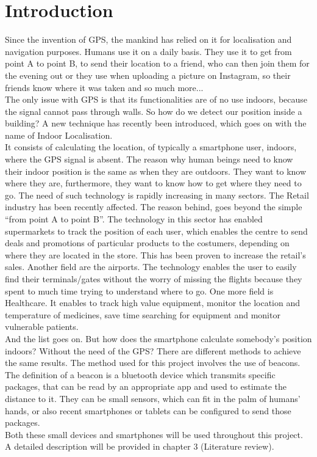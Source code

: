\chapter{Introduction}
Since the invention of GPS, the mankind has relied on it for localisation and navigation purposes. Humans use it on a daily basis. They use it to get from point A to point B, to send their location to a friend, who can then join them for the evening out or they use when uploading a picture on Instagram, so their friends know where it was taken and so much more...\\
The only issue with GPS is that its functionalities are of no use indoors, because the signal cannot pass through walls. So how do we detect our position inside a building? A new technique has recently been introduced, which goes on with the name of Indoor Localisation.\\
It consists of calculating the location, of typically a smartphone user, indoors, where the GPS signal is absent.
The reason why human beings need to know their indoor position is the same as when they are outdoors. They want to know where they are, furthermore, they want to know how to get where they need to go.
The need of such technology is rapidly increasing in many sectors. The Retail industry has been recently affected. The reason behind, goes beyond the simple “from point A to point B”. The technology in this sector has enabled supermarkets to track the position of each user, which enables the centre to send deals and promotions of particular products to the costumers, depending on where they are located in the store. This has been proven to increase the retail’s sales.
Another field are the airports. The technology enables the user to easily find their terminals/gates without the worry of missing the flights because they spent to much time trying to understand where to go.
One more field is Healthcare. It enables to track high value equipment, monitor the location and temperature of medicines, save time searching for equipment and monitor vulnerable patients.\\
And the list goes on.
But how does the smartphone calculate somebody’s position indoors? Without the need of the GPS?
There are different methods to achieve the same results. The method used for this project involves the use of beacons.\\
The definition of a beacon is a bluetooth device which transmits specific packages, that can be read by an appropriate app and used to estimate the distance to it. They can be small sensors, which can fit in the palm of humans' hands, or also recent smartphones or tablets can be configured to send those packages.\\
Both these small devices and smartphones will be used throughout this project.\\
A detailed description will be provided in chapter 3 (Literature review).